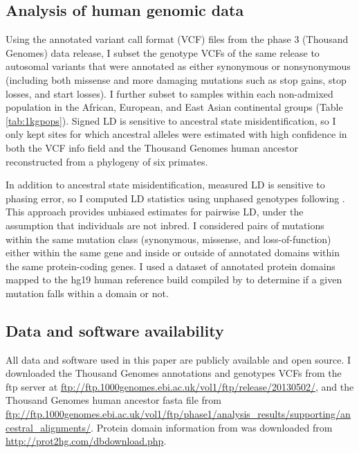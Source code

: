 \documentclass[]{article}
\begin{document}
\subsection{Analysis of human genomic data}
\label{analysis-of-human-genomic-data}

Using the annotated variant call format (VCF) files from the phase 3
\citet{1000_Genomes_Project_Consortium2015-zq} (Thousand Genomes) data release,
I subset the genotype VCFs of the same release to autosomal variants that were
annotated as either synonymous or nonsynonymous (including both missense and
more damaging mutations such as stop gains, stop losses, and start losses). I
further subset to samples within each non-admixed population in the African,
European, and East Asian continental groups (Table \ref{tab:1kgpops}). Signed
LD is sensitive to ancestral state misidentification, so I only kept sites for
which ancestral alleles were estimated with high confidence in both the VCF
info field and the Thousand Genomes human ancestor reconstructed from a
phylogeny of six primates.

In addition to ancestral state misidentification, measured LD is sensitive to
phasing error, so I computed LD statistics using unphased genotypes following
\citet{Ragsdale2020-nz}. This approach provides unbiased estimates for pairwise
LD, under the assumption that individuals are not inbred. I considered pairs of
mutations within the same mutation class (synonymous, missense, and
loss-of-function) either within the same gene and inside or outside of
annotated domains within the same protein-coding genes. I used a dataset of
annotated protein domains mapped to the hg19 human reference build compiled by
\citet{Stanek2020-pa} to determine if a given mutation falls within a domain or
not.

\subsection{Data and software availability}
\label{data-and-software-availability}

All data and software used in this paper are publicly available and open
source. I downloaded the Thousand Genomes annotations and genotypes VCFs from
the ftp server at
\url{ftp://ftp.1000genomes.ebi.ac.uk/vol1/ftp/release/20130502/}, and the
Thousand Genomes human ancestor fasta file from
\url{ftp://ftp.1000genomes.ebi.ac.uk/vol1/ftp/phase1/analysis_results/supporting/ancestral_alignments/}.
Protein domain information from \citet{Stanek2020-pa} was downloaded from
\url{http://prot2hg.com/dbdownload.php}.
\end{document}
